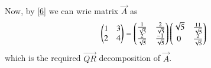 \documentclass[journal,12pt,twocolumn]{IEEEtran}
\begin{document}
Now, by \eqref{6} we can wrie matrix $\vec{A}$ as
\begin{align}
	\begin{pmatrix}1 & 3 \\ 2 & 4 \end{pmatrix}= \begin{pmatrix}\frac{1}{\sqrt{5}} & \frac{2}{\sqrt{5}} \\ \frac{2}{\sqrt{5}} & \frac{-1}{\sqrt{5}}\end{pmatrix}\begin{pmatrix}\sqrt{5} & \frac{11}{\sqrt{5}} \\ 0 & \frac{2}{\sqrt{5}}\end{pmatrix}
\end{align}
which is the required $\vec{QR}$ decomposition of $\vec{A}$.
\end{document}
